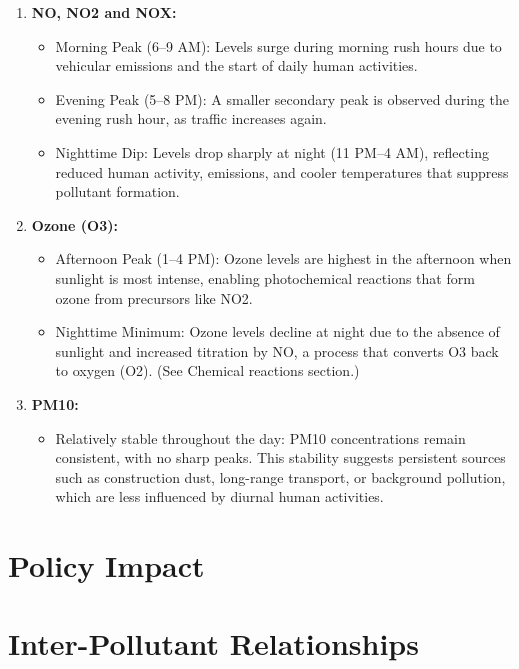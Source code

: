 \documentclass{modeleRapport}
\begin{document}
\begin{enumerate}
    \item \textbf{NO, NO2 and NOX:}
    \begin{itemize}
        \item Morning Peak (6–9 AM): Levels surge during morning rush hours due to vehicular emissions and the 
        start of daily human activities.
        \item Evening Peak (5–8 PM): A smaller secondary peak is observed during the evening rush hour, as traffic increases again.
        \item Nighttime Dip: Levels drop sharply at night (11 PM–4 AM), reflecting reduced human activity, emissions, and cooler temperatures 
        that suppress pollutant formation.\\
    \end{itemize}
    \item \textbf{Ozone (O3):}
    \begin{itemize}
        \item Afternoon Peak (1–4 PM): Ozone levels are highest in the afternoon when sunlight is most intense, enabling photochemical 
        reactions that form ozone from precursors like NO2.
        \item Nighttime Minimum: Ozone levels decline at night due to the absence of sunlight and increased titration by NO, 
        a process that converts O3 back to oxygen (O2). (See Chemical reactions section.)\\
    \end{itemize}
    \item \textbf{PM10:}
    \begin{itemize}
        \item Relatively stable throughout the day: PM10 concentrations remain consistent, with no sharp peaks. 
        This stability suggests persistent sources such as construction dust, long-range transport, or background pollution, which are less 
        influenced by diurnal human activities.\\
    \end{itemize}
\end{enumerate}

\section{Policy Impact}


\newpage
\section{Inter-Pollutant Relationships}
\end{document}
